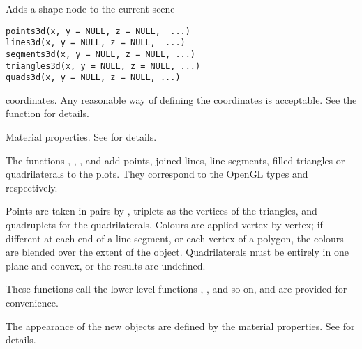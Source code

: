 \documentclass{article}
\begin{document}
\begin{Description}\relax
Adds a shape node to the current scene
\end{Description}
\begin{Usage}
\begin{verbatim}
points3d(x, y = NULL, z = NULL,  ...)
lines3d(x, y = NULL, z = NULL,  ...)
segments3d(x, y = NULL, z = NULL, ...)
triangles3d(x, y = NULL, z = NULL, ...)
quads3d(x, y = NULL, z = NULL, ...)
\end{verbatim}
\end{Usage}
\begin{Arguments}
\begin{ldescription}
\item[\code{x, y, z}] coordinates. Any reasonable way of defining the
coordinates is acceptable.  See the function 
for details.
\item[\code{ ... }] Material properties. See  for details.
\end{ldescription}
\end{Arguments}
\begin{Details}\relax
The functions , , ,
 and  add points, joined lines, line segments,
filled triangles or quadrilaterals to the plots.  They correspond to the OpenGL types
 and  respectively.  

Points are taken in pairs by , triplets as the vertices
of the triangles, and quadruplets for the quadrilaterals.  Colours are applied vertex by vertex; 
if different at each end of a line segment, or each vertex of a polygon, the colours
are blended over the extent of the object.  Quadrilaterals must be entirely 
in one plane and convex, or the results are undefined.

These functions call the lower level functions , ,
and so on, and are provided for convenience.

The appearance of the new objects are defined by the material properties.
See  for details.
\end{Details}
\end{document}
